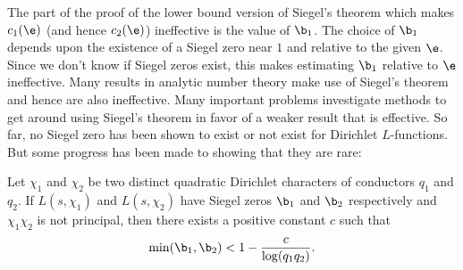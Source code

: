     The part of the proof of the lower bound version of Siegel's theorem which makes $c_{1}(\e)$ (and hence $c_{2}(\e)$) ineffective is the value of $\b_{1}$. The choice of $\b_{1}$ depends upon the existence of a Siegel zero near $1$ and relative to the given $\e$. Since we don't know if Siegel zeros exist, this makes estimating $\b_{1}$ relative to $\e$ ineffective. Many results in analytic number theory make use of Siegel's theorem and hence are also ineffective. Many important problems investigate methods to get around using Siegel's theorem in favor of a weaker result that is effective. So far, no Siegel zero has been shown to exist or not exist for Dirichlet $L$-functions. But some progress has been made to showing that they are rare:

    \begin{proposition}\label{prop:product_of_quadratic_Dirichlet_L-functions_has_one_zero}
      Let $\chi_{1}$ and $\chi_{2}$ be two distinct quadratic Dirichlet characters of conductors $q_{1}$ and $q_{2}$. If $L(s,\chi_{1})$ and $L(s,\chi_{2})$ have Siegel zeros $\b_{1}$ and $\b_{2}$ respectively and $\chi_{1}\chi_{2}$ is not principal, then there exists a positive constant $c$ such that
      \[
        \min(\b_{1},\b_{2}) < 1-\frac{c}{\log(q_{1}q_{2})}.
      \]
    \end{proposition}
